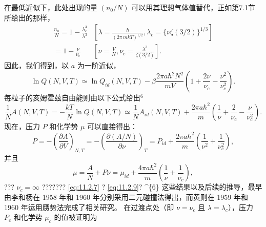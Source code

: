 在最低近似下，此处出现的量 \((n_{0}/N)\) 可以用其理想气体值替代，正如第7.1节所给出的那样，
\begin{equation}\tag{11.2.11}\label{eq:11.2.11}
\begin{array}{rl} { \frac { n _ { 0 } } { N } = 1 - \frac { \lambda _ { c } ^{3} } { \lambda ^{3} }  } & { \left[ \lambda = \frac { h } { ( 2 \pi \, m k T ) ^{1 / 2} } ,  \lambda _ { c } = \{ \nu \zeta ( 3 / 2 ) \} ^{1 / 3} \right] } \\{ = 1 - \frac { \nu } { \nu _ { c } }  } & { \left[ \nu = \frac { V } { N } ,  \nu _ { c } = \frac { \lambda ^{3} } { \zeta ( 3 / 2 ) } \right] . } \end{array}
\end{equation}
因此，我们得到，以 \(a\) 为一阶近似，
\begin{equation}\tag{11.2.12}\label{eq:11.2.12}
\ln Q ( N , V , T ) \simeq \ln Q _ { i d } ( N , V , T ) - \beta \frac { 2 \pi a \hbar ^{2} N ^{2} } { m V } \left( 1 + \frac { 2 \nu } { \nu _ { c } } - \frac { \nu ^{2} } { \nu _ { c } ^{2} } \right) .
\end{equation}
每粒子的亥姆霍兹自由能则由以下公式给出\(^{6}\)
\begin{equation}\tag{11.2.13}\label{eq:11.2.13}
\frac { 1 } { N } A ( N , V , T ) = - \frac { k T } { N } \ln Q ( N , V , T ) \simeq \frac { 1 } { N } A _ { i d } ( N , V , T ) + \frac { 2 \pi a \hbar ^{2} } { m } \left( \frac { 1 } { \nu } + \frac { 2 } { \nu _ { c } } - \frac { \nu } { \nu _ { c } ^{2} } \right) .
\end{equation}
现在，压力 \(P\) 和化学势 \(\mu\) 可以直接得出：
\begin{equation}\tag{11.2.14}\label{eq:11.2.14}
P = - \left( \frac { \partial A } { \partial V } \right) _ { N , T } = - \left( \frac { \partial ( A / N ) } { \partial \nu } \right) _ { T } = P _ { i d } + \frac { 2 \pi a \hbar ^{2} } { m } \left( \frac { 1 } { \nu ^{2} } + \frac { 1 } { \nu _ { c } ^{2} } \right) ,
\end{equation}
并且
\begin{equation}\tag{11.2.15}\label{eq:11.2.15}
\mu = \frac { A } { N } + P \nu = \mu _ { i d } + \frac { 4 \pi a \hbar ^{2} } { m } \left( \frac { 1 } { \nu } + \frac { 1 } { \nu _ { c } } \right) ,
\end{equation}
??? \(\nu_{c}=\infty\) ??????? \autoref{eq:11.2.7} ? \autoref{eq:11.2.9}?
\^{}\{6\} 这些结果以及后续的推导，最早由李和杨在 1958 年和 1960 年分别采用二元碰撞法得出，而黄则在 1959 年和 1960 年运用赝势法完成了相关研究。
在过渡点处（即 \(\nu=\nu_{c}\) 且 \(\lambda=\lambda_{c}\)），压力 \(P_{c}\) 和化学势 \(\mu_{c}\) 的值被证明为
